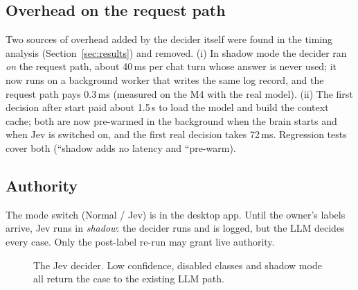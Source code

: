 \subsection{Overhead on the request path}
Two sources of overhead added by the decider itself were found in the timing analysis (Section~\ref{sec:results}) and removed. (i) In shadow mode the decider ran \emph{on} the request path, about 40\,ms per chat turn whose answer is never used; it now runs on a background worker that writes the same log record, and the request path pays 0.3\,ms (measured on the M4 with the real model). (ii) The first decision after start paid about 1.5\,s to load the model and build the context cache; both are now pre-warmed in the background when the brain starts and when Jev is switched on, and the first real decision takes 72\,ms. Regression tests cover both (``shadow adds no latency and ``pre-warm). \prov{}
\subsection{Authority}
The mode switch (Normal / Jev) is in the desktop app. Until the owner's labels arrive, Jev runs in \emph{shadow}: the decider runs and is logged, but the LLM decides every case. Only the post-label re-run may grant live authority.
\begin{figure}[t]\centering
{}
\caption{The Jev decider. Low confidence, disabled classes and shadow mode all return the case to the existing LLM path.}
\label{fig:arch}\end{figure}
